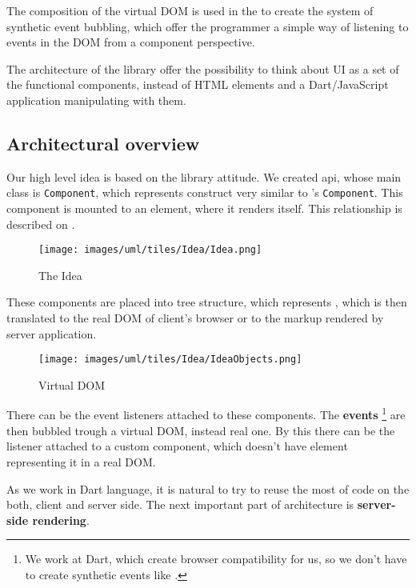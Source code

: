   The composition of the virtual DOM is used in the \tiles to create the system of synthetic event bubbling, 
  which offer the programmer a simple way of listening to events in the DOM from a component perspective.

  The architecture of the \tiles library offer the possibility to think about UI as a set of the functional components, 
  instead of HTML elements and a Dart/JavaScript application manipulating with them.

  \subsection{Architectural overview}\label{subsec:our-architecture-overview}
    Our high level idea is based on the \facebook \react library attitude. 
    We created api, whose main class is \texttt{Component}, which represents construct very similar to \react's \texttt{Component}.
    This component is mounted to an element, where it renders itself. 
    This relationship is described on .
    \begin{figure}[h]
    \centering  
      \texttt{[image: images/uml/tiles/Idea/Idea.png]}
      \caption{The Idea}
      \label{img:library-idea}
    \end{figure}

    These components are placed into tree structure, which represents \mbox{\textbf{}}, 
    which is then translated to the real DOM of client's browser or to the markup rendered by server application.

    \begin{figure}[h]
    \centering  
      \texttt{[image: images/uml/tiles/Idea/IdeaObjects.png]}
      \caption{Virtual DOM}
      \label{img:library-idea-virtual-dom}
    \end{figure}
    There can be the event listeners attached to these components. 
    The \textbf{events} 
    \footnote{We work at Dart, which create browser compatibility for us, so we don't have to create synthetic events like \react.}
    are then bubbled trough a virtual DOM, instead real one.
    By this there can be the listener attached to a custom component, which doesn't have element representing it in a real DOM.

    As we work in Dart language, it is natural to try to reuse the most of code on the both, client and server side.
    The next important part of architecture is \textbf{server-side rendering}.

